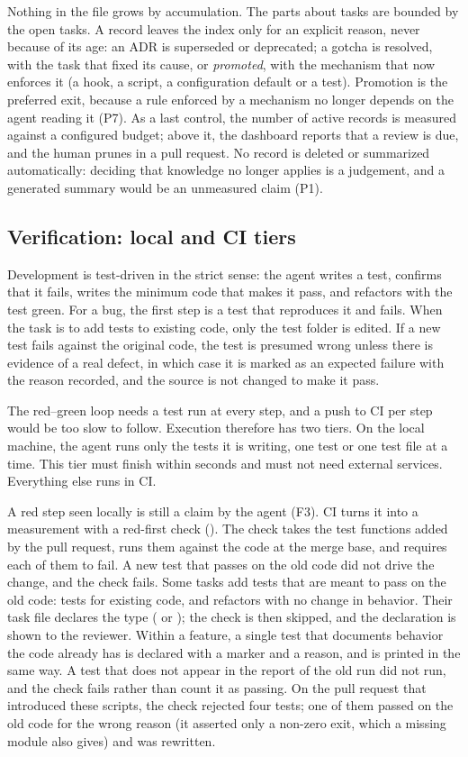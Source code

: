 \documentclass[11pt,a4paper]{article}
\newcommand{\code}[1]{\path{#1}}
\begin{document}
Nothing in the file grows by accumulation. The parts about tasks are bounded by the open tasks. A record leaves the index only for an explicit reason, never because of its age: an ADR is superseded or deprecated; a gotcha is resolved, with the task that fixed its cause, or \emph{promoted}, with the mechanism that now enforces it (a hook, a script, a configuration default or a test). Promotion is the preferred exit, because a rule enforced by a mechanism no longer depends on the agent reading it (P7). As a last control, the number of active records is measured against a configured budget; above it, the dashboard reports that a review is due, and the human prunes in a pull request. No record is deleted or summarized automatically: deciding that knowledge no longer applies is a judgement, and a generated summary would be an unmeasured claim (P1).

\subsection{Verification: local and CI tiers}
\label{sec:ci}

Development is test-driven in the strict sense: the agent writes a test, confirms that it fails, writes the minimum code that makes it pass, and refactors with the test green. For a bug, the first step is a test that reproduces it and fails. When the task is to add tests to existing code, only the test folder is edited. If a new test fails against the original code, the test is presumed wrong unless there is evidence of a real defect, in which case it is marked as an expected failure with the reason recorded, and the source is not changed to make it pass.

The red--green loop needs a test run at every step, and a push to CI per step would be too slow to follow. Execution therefore has two tiers. On the local machine, the agent runs only the tests it is writing, one test or one test file at a time. This tier must finish within seconds and must not need external services. Everything else runs in CI.

A red step seen locally is still a claim by the agent (F3). CI turns it into a measurement with a red-first check (\code{scripts/red_check.py}). The check takes the test functions added by the pull request, runs them against the code at the merge base, and requires each of them to fail. A new test that passes on the old code did not drive the change, and the check fails. Some tasks add tests that are meant to pass on the old code: tests for existing code, and refactors with no change in behavior. Their task file declares the type (\code{tests-only} or \code{refactor}); the check is then skipped, and the declaration is shown to the reviewer. Within a feature, a single test that documents behavior the code already has is declared with a \code{characterization} marker and a reason, and is printed in the same way. A test that does not appear in the report of the old run did not run, and the check fails rather than count it as passing. On the pull request that introduced these scripts, the check rejected four tests; one of them passed on the old code for the wrong reason (it asserted only a non-zero exit, which a missing module also gives) and was rewritten.
\end{document}
